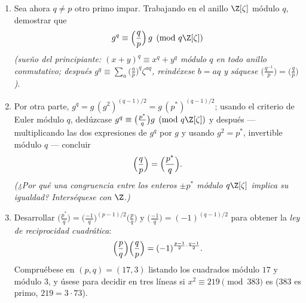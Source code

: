 \begin{problem}
\begin{enumerate}[resume]
        $\sqrt{p^*} \in \Q(\zeta_p)$ y concluir que el \emph{único}
        subcuerpo cuadrático de $\Q(\zeta_p)$ es $\Q(\sqrt{p^*})$ ---
        único porque $\operatorname{Gal}(\Q(\zeta_p)/\Q)$ es cíclico
        (el~\cref{thm:b3:galois:cyclotomicirred}) y un grupo cíclico
        tiene exactamente un subgrupo de índice $2$. (Todo cuerpo
        cuadrático se sumerge en algún cuerpo ciclotómico --- este es el
        primer caso del teorema de Kronecker--Weber, cuya forma general
        queda muy lejos.) \item Sea ahora $q \neq p$ otro primo impar.
        Trabajando en el anillo $\Z[\zeta]$ módulo $q$, demostrar que
        \[
        g^q \equiv \Bigl(\frac qp\Bigr)\,g \pmod{q\Z[\zeta]}
        \]
        \emph{(sueño del principiante: $(x + y)^q \equiv x^q + y^q$
        módulo $q$ en todo anillo conmutativo; después $g^q \equiv
        \sum_a\bigl(\frac ap\bigr)^q\zeta^{aq}$, reindéxese $b =
        aq$ y sáquese $\bigl(\frac{q^{-1}}p\bigr) =
        \bigl(\frac qp\bigr)$)}. \item Por otra parte,
        $g^q = g\,(g^2)^{(q-1)/2} =
        g\,(p^*)^{(q-1)/2}$; usando el criterio de Euler módulo $q$,
        dedúzcase $g^q \equiv \bigl(\frac{p^*}q\bigr)g
        \pmod{q\Z[\zeta]}$ y después --- multiplicando las dos
        expresiones de $g^q$ por $g$ y usando $g^2 = p^*$, invertible
        módulo $q$ --- concluir
        \[
        \Bigl(\frac qp\Bigr) = \Bigl(\frac{p^*}q\Bigr) .
        \]
        \emph{(¿Por qué una congruencia entre los enteros $\pm p^*$
        módulo $q\Z[\zeta]$ implica su igualdad? Interséquese con
        $\Z$.)} \item Desarrollar $\bigl(\frac{p^*}q\bigr) =
        \bigl(\frac{-1}q\bigr)^{(p-1)/2}\bigl(\frac pq\bigr)$ y
        $\bigl(\frac{-1}q\bigr) = (-1)^{(q-1)/2}$ para obtener la
        \emph{ley de reciprocidad cuadrática}:
        \[
        \Bigl(\frac pq\Bigr)\Bigl(\frac qp\Bigr)
        = (-1)^{\frac{p-1}2\cdot\frac{q-1}2} .
        \]
        Compruébese en $(p, q) = (17, 3)$ listando los cuadrados módulo
        $17$ y módulo $3$, y úsese para decidir en tres líneas si
        $x^2 \equiv 219 \pmod{383}$ es
         ($383$ es primo,
        $219 = 3\cdot73$).
\end{enumerate}


\end{problem}

